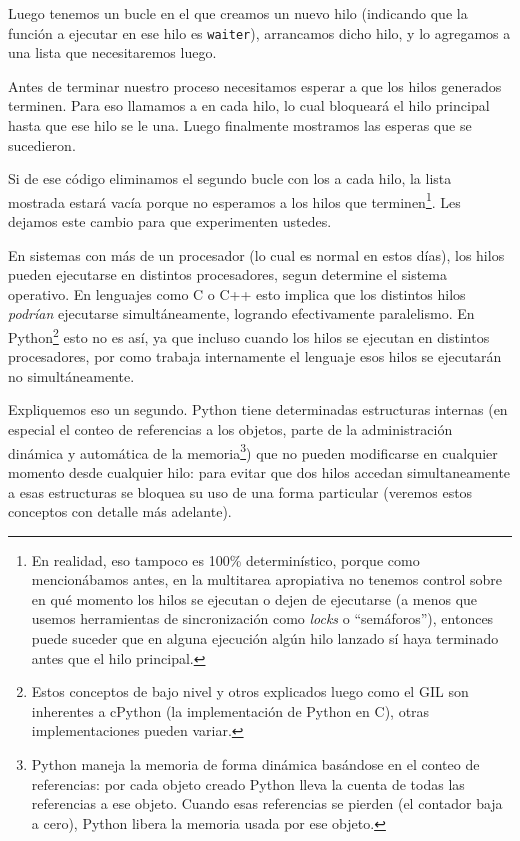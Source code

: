 Luego tenemos un bucle  en el que creamos un nuevo hilo (indicando que la función a ejecutar en ese hilo es \texttt{waiter}), arrancamos dicho hilo, y lo agregamos a una lista que necesitaremos luego.

Antes de terminar nuestro proceso necesitamos esperar a que los hilos generados terminen. Para eso llamamos a  en cada hilo, lo cual bloqueará el hilo principal hasta que ese hilo se le una. Luego finalmente mostramos las esperas que se sucedieron.


Si de ese código eliminamos el segundo bucle con los  a cada hilo, la lista mostrada estará vacía porque no esperamos a los hilos que terminen\footnote{En realidad, eso tampoco es 100\% determinístico, porque como mencionábamos antes, en la multitarea apropiativa no tenemos control sobre en qué momento los hilos se ejecutan o dejen de ejecutarse (a menos que usemos herramientas de sincronización como \textit{locks} o ``semáforos''), entonces puede suceder que en alguna ejecución algún hilo lanzado sí haya terminado antes que el hilo principal.}. Les dejamos este cambio para que experimenten ustedes.

En sistemas con más de un procesador (lo cual es normal en estos días), los hilos pueden ejecutarse en distintos procesadores, segun determine el sistema operativo. En lenguajes como C o C++ esto implica que los distintos hilos \textit{podrían} ejecutarse simultáneamente, logrando efectivamente paralelismo. En Python\footnote{Estos conceptos de bajo nivel y otros explicados luego como el GIL son inherentes a cPython (la implementación de Python en C), otras implementaciones pueden variar.} esto no es así, ya que incluso cuando los hilos se ejecutan en distintos procesadores, por como trabaja internamente el lenguaje esos hilos se ejecutarán no simultáneamente.

Expliquemos eso un segundo. Python tiene determinadas estructuras internas (en especial el conteo de referencias a los objetos, parte de la administración dinámica y automática de la memoria\footnote{Python maneja la memoria de forma dinámica basándose en el conteo de referencias: por cada objeto creado Python lleva la cuenta de todas las referencias a ese objeto. Cuando esas referencias se pierden (el contador baja a cero), Python libera la memoria usada por ese objeto.}) que no pueden modificarse en cualquier momento desde cualquier hilo: para evitar que dos hilos accedan simultaneamente a esas estructuras se bloquea su uso de una forma particular (veremos estos conceptos con detalle más adelante).

